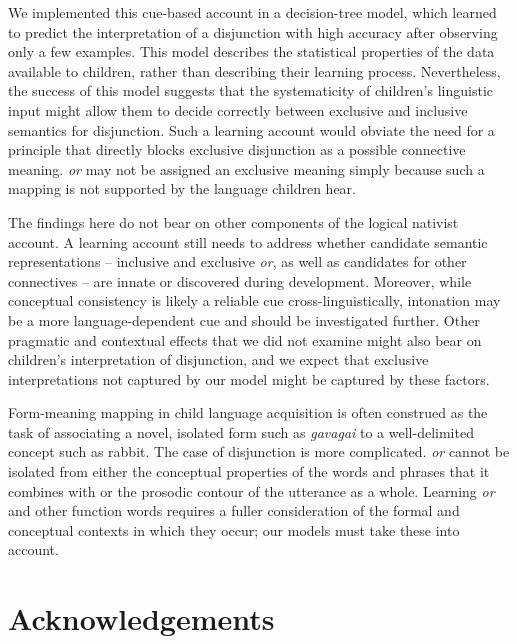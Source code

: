 \documentclass[10pt, letterpaper]{article}
\begin{document}
We implemented this cue-based account in a decision-tree model, which
learned to predict the interpretation of a disjunction with high
accuracy after observing only a few examples. This model describes the
statistical properties of the data available to children, rather than
describing their learning process. Nevertheless, the success of this
model suggests that the systematicity of children's linguistic input
might allow them to decide correctly between exclusive and inclusive
semantics for disjunction. Such a learning account would obviate the
need for a principle that directly blocks exclusive disjunction as a
possible connective meaning. \emph{or} may not be assigned an exclusive
meaning simply because such a mapping is not supported by the language
children hear.

The findings here do not bear on other components of the logical
nativist account. A learning account still needs to address whether
candidate semantic representations -- inclusive and exclusive \emph{or},
as well as candidates for other connectives -- are innate or discovered
during development. Moreover, while conceptual consistency is likely a
reliable cue cross-linguistically, intonation may be a more
language-dependent cue and should be investigated further. Other
pragmatic and contextual effects that we did not examine might also bear
on children's interpretation of disjunction, and we expect that
exclusive interpretations not captured by our model might be captured by
these factors.

Form-meaning mapping in child language acquisition is often construed as
the task of associating a novel, isolated form such as \emph{gavagai} to
a well-delimited concept such as rabbit. The case of disjunction is more
complicated. \emph{or} cannot be isolated from either the conceptual
properties of the words and phrases that it combines with or the
prosodic contour of the utterance as a whole. Learning \emph{or} and
other function words requires a fuller consideration of the formal and
conceptual contexts in which they occur; our models must take these into
account.

\vspace{1em}
\vspace{1em}

\section{Acknowledgements}\label{acknowledgements}
\end{document}
